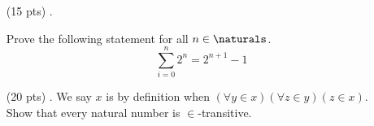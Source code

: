 \begin{enumerate}
  \item[(15 pts) \quad 5.]

    Prove the following statement for all $n \in \naturals$.
    \begin{equation*}
      \sum_{i = 0}^{n} 2^n = 2^{n + 1} - 1
    \end{equation*}

  \item[(20 pts) \quad 6.]
    We say $x$ is  by definition when $(\forall y \in x)(\forall z \in y)(z \in x)$. \\
    Show that every natural number is $\in$-transitive.
\end{enumerate}


